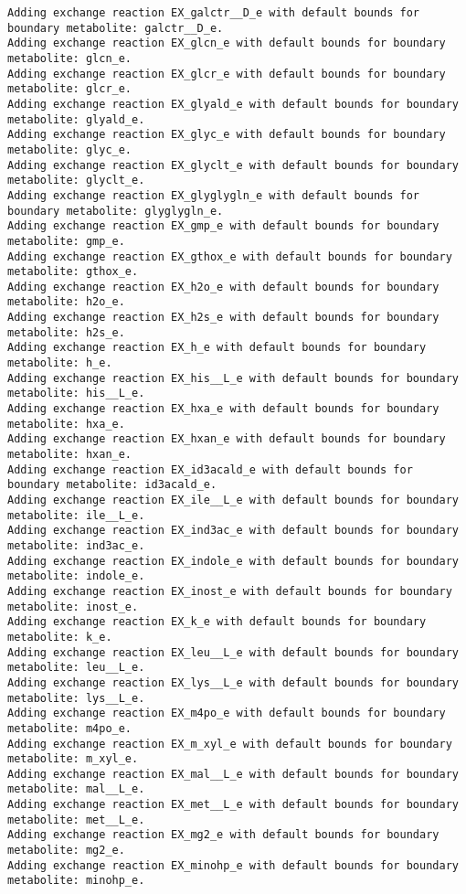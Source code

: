\documentclass[
  letterpaper,
  DIV=11,
  numbers=noendperiod]{scrartcl}
\begin{document}
\begin{verbatim}
Adding exchange reaction EX_galctr__D_e with default bounds for boundary metabolite: galctr__D_e.
Adding exchange reaction EX_glcn_e with default bounds for boundary metabolite: glcn_e.
Adding exchange reaction EX_glcr_e with default bounds for boundary metabolite: glcr_e.
Adding exchange reaction EX_glyald_e with default bounds for boundary metabolite: glyald_e.
Adding exchange reaction EX_glyc_e with default bounds for boundary metabolite: glyc_e.
Adding exchange reaction EX_glyclt_e with default bounds for boundary metabolite: glyclt_e.
Adding exchange reaction EX_glyglygln_e with default bounds for boundary metabolite: glyglygln_e.
Adding exchange reaction EX_gmp_e with default bounds for boundary metabolite: gmp_e.
Adding exchange reaction EX_gthox_e with default bounds for boundary metabolite: gthox_e.
Adding exchange reaction EX_h2o_e with default bounds for boundary metabolite: h2o_e.
Adding exchange reaction EX_h2s_e with default bounds for boundary metabolite: h2s_e.
Adding exchange reaction EX_h_e with default bounds for boundary metabolite: h_e.
Adding exchange reaction EX_his__L_e with default bounds for boundary metabolite: his__L_e.
Adding exchange reaction EX_hxa_e with default bounds for boundary metabolite: hxa_e.
Adding exchange reaction EX_hxan_e with default bounds for boundary metabolite: hxan_e.
Adding exchange reaction EX_id3acald_e with default bounds for boundary metabolite: id3acald_e.
Adding exchange reaction EX_ile__L_e with default bounds for boundary metabolite: ile__L_e.
Adding exchange reaction EX_ind3ac_e with default bounds for boundary metabolite: ind3ac_e.
Adding exchange reaction EX_indole_e with default bounds for boundary metabolite: indole_e.
Adding exchange reaction EX_inost_e with default bounds for boundary metabolite: inost_e.
Adding exchange reaction EX_k_e with default bounds for boundary metabolite: k_e.
Adding exchange reaction EX_leu__L_e with default bounds for boundary metabolite: leu__L_e.
Adding exchange reaction EX_lys__L_e with default bounds for boundary metabolite: lys__L_e.
Adding exchange reaction EX_m4po_e with default bounds for boundary metabolite: m4po_e.
Adding exchange reaction EX_m_xyl_e with default bounds for boundary metabolite: m_xyl_e.
Adding exchange reaction EX_mal__L_e with default bounds for boundary metabolite: mal__L_e.
Adding exchange reaction EX_met__L_e with default bounds for boundary metabolite: met__L_e.
Adding exchange reaction EX_mg2_e with default bounds for boundary metabolite: mg2_e.
Adding exchange reaction EX_minohp_e with default bounds for boundary metabolite: minohp_e.

\end{verbatim}
\end{document}
